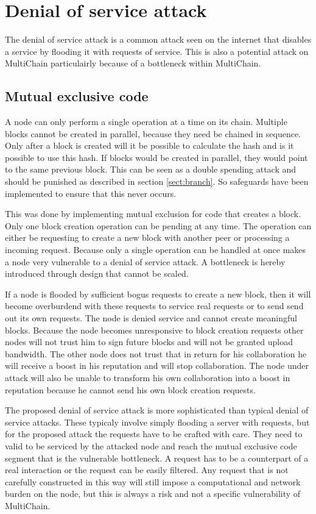 \section{Denial of service attack}
The denial of service attack is a common attack seen on the internet
that disables a service by flooding it with requests of service.
This is also a potential attack on MultiChain particulairly because of a bottleneck within MultiChain.

\subsection{Mutual exclusive code}
A node can only perform a single operation at a time on its chain.
Multiple blocks cannot be created in parallel,
because they need be chained in sequence.
Only after a block is created will it be possible to calculate the hash and is it possible to use this hash.
If blocks would be created in parallel, they would point to the same previous block.
This can be seen as a double spending attack and should be punished as described in section \ref{sect:branch}.
So safeguards have been implemented to ensure that this never occurs.

This was done by implementing mutual exclusion for code that creates a block.
Only one block creation operation can be pending at any time.
The operation can either be requesting to create a new block with another peer or
processing a incoming request.
Because only a single operation can be handled at once
makes a node very vulnerable to a denial of service attack.
A bottleneck is hereby introduced through design that cannot be scaled.

If a node is flooded by sufficient bogus requests to create a new block,
then it will become overburdend with these requests to service real requests or to send send out its own requests.
The node is denied service and cannot create meaningful blocks.
Because the node becomes unresponsive to block creation requests other nodes will not trust him to sign future blocks
and will not be granted upload bandwidth.
The other node does not trust that in return for his collaboration he will receive a boost in his reputation
and will stop collaboration.
The node under attack will also be unable to transform his own collaboration into a boost in reputation
because he cannot send his own block creation requests.

The proposed denial of service attack is more sophisticated than typical denial of service attacks.
These typicaly involve simply flooding a server with requests,
but for the proposed attack the requests have to be crafted with care.
They need to valid to be serviced by the attacked node and reach the mutual exclusive code segment
that is the vulnerable bottleneck.
A request has to be a counterpart of a real interaction or the request can be easily filtered.
Any request that is not carefully constructed in this way
will still impose a computational and network burden on the node,
but this is always a risk and not a specific vulnerability of MultiChain.

